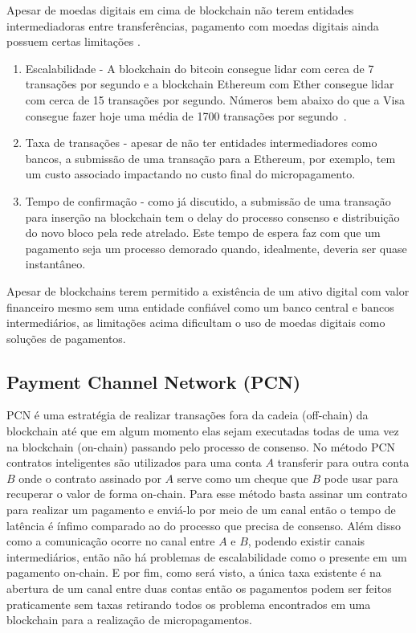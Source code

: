 \documentclass[12pt]{article}
\begin{document}
Apesar de moedas digitais em cima de blockchain não terem entidades intermediadoras entre transferências, pagamento com moedas digitais ainda possuem certas limitações \cite{mercan2021cryptocurrency}.
\begin{enumerate}
    \item Escalabilidade - A blockchain do bitcoin consegue lidar com cerca de 7 transações por segundo e a blockchain Ethereum com Ether consegue lidar com cerca de 15 transações por segundo. Números bem abaixo do que a Visa consegue fazer hoje uma média de 1700 transações por segundo~\cite{mercan2021cryptocurrency, visa2019speed, ethereum2021oficial}.
    \item Taxa de transações - apesar de não ter entidades intermediadores como bancos, a submissão de uma transação para a Ethereum, por exemplo, tem um custo associado impactando no custo final do micropagamento. 
    \item Tempo de confirmação - como já discutido, a submissão de uma transação para inserção na blockchain tem o delay do processo consenso e distribuição do novo bloco pela rede atrelado. Este tempo de espera faz com que um pagamento seja um processo demorado quando, idealmente, deveria ser quase instantâneo. 
\end{enumerate}

Apesar de blockchains terem permitido a existência de um ativo digital com valor financeiro mesmo sem uma entidade confiável como um banco central e bancos intermediários, as limitações acima dificultam o uso de moedas digitais como soluções de pagamentos. 

\subsection{Payment Channel Network (PCN)}

PCN é uma estratégia de realizar transações fora da cadeia (off-chain) da blockchain até que em algum momento elas sejam executadas todas de uma vez na blockchain (on-chain) passando pelo processo de consenso\cite{mercan2021cryptocurrency}. No método PCN contratos inteligentes são utilizados para uma conta $A$ transferir para outra conta $B$ onde o contrato assinado por $A$ serve como um cheque que $B$ pode usar para recuperar o valor de forma on-chain. Para esse método basta assinar um contrato para realizar um pagamento e enviá-lo por meio de um canal então o tempo de latência é ínfimo comparado ao do processo que precisa de consenso. Além disso como a comunicação ocorre no canal entre $A$ e $B$, podendo existir canais intermediários, então não há problemas de escalabilidade como o presente em um pagamento on-chain. E por fim, como será visto, a única taxa existente é na abertura de um canal entre duas contas então os pagamentos podem ser feitos praticamente sem taxas retirando todos os problema encontrados em uma blockchain para a realização de micropagamentos.
\end{document}
